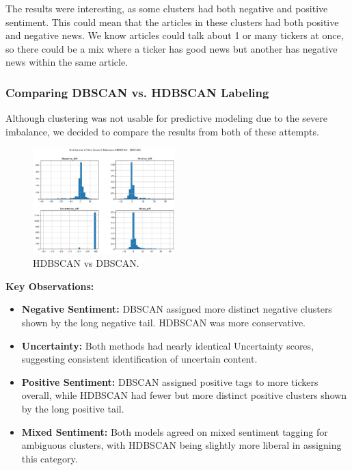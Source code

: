 \documentclass[twocolumn]{article}
\begin{document}
The results were interesting, as some clusters had both negative and positive sentiment. This could mean that the articles in these clusters had both positive and negative news. We know articles could talk about 1 or many tickers at once, so there could be a mix where a ticker has good news but another has negative news within the same article.

\subsubsection*{Comparing DBSCAN vs. HDBSCAN Labeling}

Although clustering was not usable for predictive modeling due to the severe imbalance, we decided to compare the results from both of these attempts.

\begin{figure}[h!]
    \centering
    \includegraphics[width=0.49\textwidth]{hdbscan_vs_dbscan.png}
    \caption{HDBSCAN vs DBSCAN.}
    \label{fig:hdbscan-vs-dbscan}
\end{figure}



\textbf{Key Observations:}
\begin{itemize}
    \item \textbf{Negative Sentiment:} DBSCAN assigned more distinct negative clusters shown by the long negative tail. HDBSCAN was more conservative.
    \item \textbf{Uncertainty:} Both methods had nearly identical Uncertainty scores, suggesting consistent identification of uncertain content.
    \item \textbf{Positive Sentiment:} DBSCAN assigned positive tags to more tickers overall, while HDBSCAN had fewer but more distinct positive clusters shown by the long positive tail.
    \item \textbf{Mixed Sentiment:} Both models agreed on mixed sentiment tagging for ambiguous clusters, with HDBSCAN being slightly more liberal in assigning this category.
\end{itemize}
\end{document}
